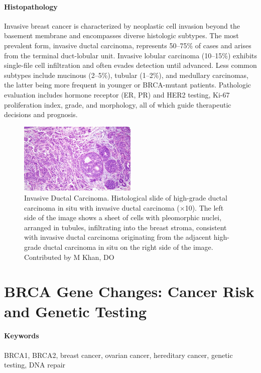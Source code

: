 \documentclass[10pt]{extarticle}
\begin{document}
\paragraph{Histopathology}
Invasive breast cancer is characterized by neoplastic cell invasion beyond the basement membrane and encompasses diverse histologic subtypes. The most prevalent form, invasive ductal carcinoma, represents 50–75\% of cases and arises from the terminal duct-lobular unit. Invasive lobular carcinoma (10–15\%) exhibits single-file cell infiltration and often evades detection until advanced. Less common subtypes include mucinous (2–5\%), tubular (1–2\%), and medullary carcinomas, the latter being more frequent in younger or BRCA-mutant patients. Pathologic evaluation includes hormone receptor (ER, PR) and HER2 testing, Ki-67 proliferation index, grade, and morphology, all of which guide therapeutic decisions and prognosis.

\begin{figure}[h]
    \centering
    \includegraphics[width=0.5\textwidth]{Figures/Invasive Ductal Carcinoma..jpg} %
    \caption{Invasive Ductal Carcinoma. Histological slide of high-grade ductal carcinoma in situ with invasive ductal carcinoma (×10). The left side of the image shows a sheet of cells with pleomorphic nuclei, arranged in tubules, infiltrating into the breast stroma, consistent with invasive ductal carcinoma originating from the adjacent high-grade ductal carcinoma in situ on the right side of the image. Contributed by M Khan, DO}
    \label{fig:invasive_tumore}
\end{figure}





\section{BRCA Gene Changes: Cancer Risk and Genetic Testing}

\paragraph{Keywords} BRCA1, BRCA2, breast cancer, ovarian cancer, hereditary cancer, genetic testing, DNA repair  \cite{nci_brca_2024}
\end{document}
